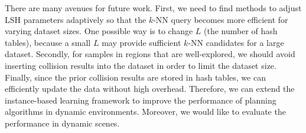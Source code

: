There are many avenues for future work. First, we need to find methods to adjust LSH parameters adaptively so that the $k$-NN query becomes more efficient for varying dataset sizes. One possible way is to change $L$ (the number of hash tables), because a small $L$ may provide sufficient $k$-NN candidates for a large dataset. Secondly, for samples in regions that are well-explored, we should avoid inserting collision results into the dataset in order to limit the dataset size. Finally, since the prior collision results are stored in hash tables, we can efficiently update the data without high overhead. Therefore, we can extend the instance-based learning framework to improve the performance of planning algorithms in dynamic environments. Moreover, we would like to evaluate the performance in dynamic scenes.



